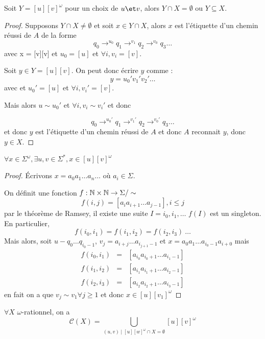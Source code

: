 \begin{prop}\label{prop:buchi1}
	Soit $Y = [u][v]^{\omega}$ pour un choix de $u \et v$, alors $Y \cap X = \emptyset$ ou $Y \subseteq X$.
\end{prop}


\begin{proof}
	Supposons $Y \cap X \neq \emptyset$ et soit $x \in Y \cap X$, alors $x$ est l'étiquette d'un chemin réussi de $A$
	de la forme
	$$q_0 \to^{u_0} q_1 \to^{v_1} q_2 \to^{v_0} q_3 \ldots$$
	avec x = [v][v] et $u_0 = [u]$ et $\forall i, v_i = [v]$.

	Soit $y \in Y = [u][v]$. On peut donc écrire $y$ comme :
	$$ y = u_0'v_1'v_2'\ldots$$
	avec et $u_0' = [u]$ et $\forall i, v_i' = [v]$.

	Mais alors $u \sim u_0'$ et $\forall i, v_i \sim v_i'$ et donc

	$$q_0 \to^{u_0'} q_1 \to^{v_1'} q_2 \to^{v_0'} q_3 \ldots$$
	et donc $y$ est l'étiquette d'un chemin réussi de $A$ et donc $A$ reconnait $y$, donc $y \in X$.
\end{proof}



\begin{prop}\label{prop:buchi2}
	$\forall x \in \Sigma^{\omega}, \exists u,v \in \Sigma^*, x \in [u][v]^{\omega}$
\end{prop}


\begin{proof}
	Écrivons $x = a_0a_1 \ldots a_n \ldots$ où $a_i \in \Sigma$.

	On définit une fonction $f : \mathbb{N} \times \mathbb{N} \to \Sigma/\sim$
	$$f(i,j) = [a_ia_{i+1}\ldots a_{j-1}], i \leq j$$
	par le théorème de Ramsey, il existe une suite $I = i_0,i_1,\ldots$ \tlq $f(I)$ est un singleton.
	En particulier,
	$$f(i_0,i_1) = f(i_1,i_2) = f(i_2,i_3) \ \ldots$$
	Mais alors, soit $u - q_0 \ldots q_{i_0-1}$, $v_j = a_{i+j} \ldots a_{{i_{j+1} -1}}$ et $x = a_0a_ 1\ldots a_{i_0-1}a_{i+0}$
	mais
	\begin{eqnarray*}
		f(i_0,i_1) &=& [a_{i_0} a_{i_0+1}\ldots a_{i_1-1}] \\
		f(i_1,i_2) &=& [a_{i_1} a_{i_1+1}\ldots a_{i_2-1}] \\
		f(i_2,i_3) &=& [a_{i_2} a_{i_2+1}\ldots a_{i_3-1}]
	\end{eqnarray*}
	en fait on a que $v_j \sim v_1 \forall j \geq 1$ et donc $x \in [u][v_1]^{\omega}$
\end{proof}

\begin{theorem}
	$\forall X$ $\omega$-rationnel, on a
	$$ \mathcal{C}(X) = \bigcup_{(u,v) \mid [u][w]^{\omega} \cap X = \emptyset} [u][v]^{\omega}$$
\end{theorem}

